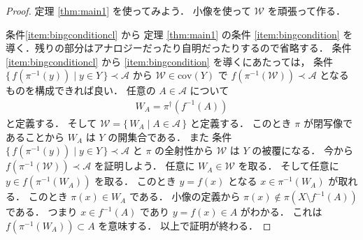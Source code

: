 \documentclass[leqno, a4paper, 12pt]{jsarticle}
\numberwithin{equation}{section}
\newcommand{\yocov}[1]{\mathrm{cov}(#1)}
\newcommand{\yocovfont}[1]{\mathscr{#1}}
\newcommand{\yofine}{\prec}
\newcommand{\yosmim}[1]{#1^{\dagger}}
\begin{document}
\begin{proof}
定理
\ref{thm:main1}
を使ってみよう．
小像を使って
$\yocovfont{W}$
を頑張って作る．

条件\ref{item:bingconditioncl}
から
定理
\ref{thm:main1}
の条件
\ref{item:bingcondition}
を導く．残りの部分はアナロジーだったり自明だったりするので省略する．
条件\ref{item:bingconditioncl}
から
\ref{item:bingcondition}
を導くにあたっては，
条件
$\{\, f(\pi^{-1}(y))\mid y\in Y\, \}\yofine \yocovfont{A}$
から
$\yocovfont{W}\in \yocov{Y}$
で
$f(\pi^{-1}(\yocovfont{W}))\yofine \yocovfont{A}$
となるものを構成できれば良い．
任意の
$A\in \yocovfont{A}$
について
\begin{align}
W_{A}=\yosmim{\pi}(f^{-1}(A))
\end{align}
と定義する．
そして
$\yocovfont{W}=\{\, W_{A}\mid A\in \yocovfont{A}\, \}$
と定義する．
このとき
$\pi$
が閉写像であることから
$W_{A}$
は
$Y$
の開集合である．
また
条件
$\{\, f(\pi^{-1}(y))\mid y\in Y\, \}\yofine \yocovfont{A}$
と
$\pi$
の全射性から
$\yocovfont{W}$
は
$Y$
の被覆になる．
今から
$f(\pi^{-1}(\yocovfont{W}))\yofine \yocovfont{A}$
を証明しよう．
任意に
$W_{A}\in \yocovfont{W}$
を取る．
そして任意に
$y\in f(\pi^{-1}(W_{A}))$
を取る．
このとき
$y=f(x)$
となる
$x\in \pi^{-1}(W_{A})$
が取れる．
このとき
$\pi(x)\in W_{A}$
である．
小像の定義から
$\pi(x)\not\in \pi(X\setminus f^{-1}(A))$
である．
つまり
$x\in f^{-1}(A)$
であり
$y=f(x)\in A$
がわかる．
これは
$f(\pi^{-1}(W_{A}))\subset A$
を意味する．
以上で証明が終わる．
\end{proof}
\end{document}
